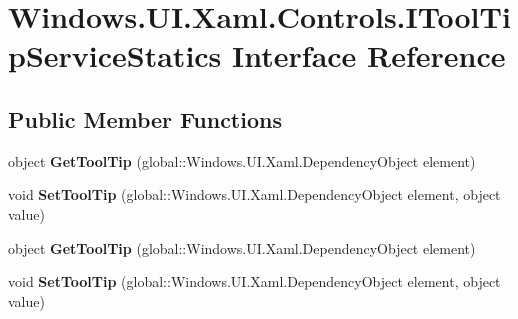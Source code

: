\hypertarget{interface_windows_1_1_u_i_1_1_xaml_1_1_controls_1_1_i_tool_tip_service_statics}{}\section{Windows.\+U\+I.\+Xaml.\+Controls.\+I\+Tool\+Tip\+Service\+Statics Interface Reference}
\label{interface_windows_1_1_u_i_1_1_xaml_1_1_controls_1_1_i_tool_tip_service_statics}
\subsection*{Public Member Functions}
\begin{DoxyCompactItemize}
\item 
\mbox{\label{interface_windows_1_1_u_i_1_1_xaml_1_1_controls_1_1_i_tool_tip_service_statics_a1e203699b88ee755f3d5a6872240a045}} 
object {\bfseries Get\+Tool\+Tip} (global\+::\+Windows.\+U\+I.\+Xaml.\+Dependency\+Object element)
\item 
\mbox{\label{interface_windows_1_1_u_i_1_1_xaml_1_1_controls_1_1_i_tool_tip_service_statics_a4769ab069237aeb3fbe8be1f8f0b29f3}} 
void {\bfseries Set\+Tool\+Tip} (global\+::\+Windows.\+U\+I.\+Xaml.\+Dependency\+Object element, object value)
\item 
\mbox{\label{interface_windows_1_1_u_i_1_1_xaml_1_1_controls_1_1_i_tool_tip_service_statics_a1e203699b88ee755f3d5a6872240a045}} 
object {\bfseries Get\+Tool\+Tip} (global\+::\+Windows.\+U\+I.\+Xaml.\+Dependency\+Object element)
\item 
\mbox{\label{interface_windows_1_1_u_i_1_1_xaml_1_1_controls_1_1_i_tool_tip_service_statics_a4769ab069237aeb3fbe8be1f8f0b29f3}} 
void {\bfseries Set\+Tool\+Tip} (global\+::\+Windows.\+U\+I.\+Xaml.\+Dependency\+Object element, object value)
\item 
\mbox{\label{interface_windows_1_1_u_i_1_1_xaml_1_1_controls_1_1_i_tool_tip_service_statics_a1e203699b88ee755f3d5a6872240a045}} 

\end{DoxyCompactItemize}
